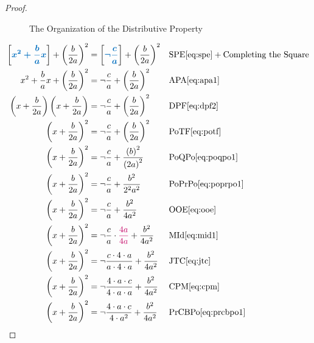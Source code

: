 \documentclass[20150903-160354-rs2.2-MarksMathNotebook.tex]{subfiles}
\begin{document}
\begin{proof}
\begin{figure}[h!]
\begin{center}
\caption{The Organization of the Distributive Property}
\end{center}
\end{figure}

\begin{align*}
\farg{x^2+\dfrac{b}{a}x}+\left( \dfrac{b}{2a} \right)^2 &= \farg{\neg \dfrac{c}{a}} + \left( \dfrac{b}{2a} \right)^2 && \text{SPE} \eqref{eq:spe}+ \text{Completing the Square} \\
x^2+\dfrac{b}{a}x +\left( \dfrac{b}{2a} \right)^2 &= \neg \dfrac{c}{a}+ \left( \dfrac{b}{2a} \right)^2 && \text{APA} \eqref{eq:apa1} \\
\left( x+ \dfrac{b}{2a} \right) \left( x+ \dfrac{b}{2a} \right)& = \neg \dfrac{c}{a} + \left( \dfrac{b}{2a} \right)^2 && \text{DPF} \eqref{eq:dpf2} \\
\left( x+ \dfrac{b}{2a} \right)^2 &=\neg \dfrac{c}{a} + \left( \dfrac{b}{2a} \right)^2 && \text{PoTF} \eqref{eq:potf} \\
\left( x+ \dfrac{b}{2a} \right)^2 &=\neg \dfrac{c}{a} +  \dfrac{\left(b \right)^2}{\left(2a \right)^2}  && \text{PoQPo} \eqref{eq:poqpo1} \\
\left( x+ \dfrac{b}{2a} \right)^2 &=\neg \dfrac{c}{a} +  \dfrac{b^2}{2^2a^2} && \text{PoPrPo} \eqref{eq:poprpo1} \\
\left( x+ \dfrac{b}{2a} \right)^2 &=\neg \dfrac{c}{a} +  \dfrac{b^2}{4a^2} && \text{OOE} \eqref{eq:ooe} \\
\left( x+ \dfrac{b}{2a} \right)^2 &=\neg \dfrac{c}{a} \cdot {\color{sthlmRed}\dfrac{4a}{4a}} +  \dfrac{b^2}{4a^2}  && \text{MId} \eqref{eq:mid1} \\
\left( x+ \dfrac{b}{2a} \right)^2 &=\neg \dfrac{c \cdot 4 \cdot a}{a \cdot 4 \cdot a} +  \dfrac{b^2}{4a^2} && \text{JTC} \eqref{eq:jtc} \\
\left( x+ \dfrac{b}{2a} \right)^2 &=\neg \dfrac{4 \cdot a \cdot c}{4 \cdot a \cdot a} +  \dfrac{b^2}{4a^2}  && \text{CPM} \eqref{eq:cpm} \\
\left( x+ \dfrac{b}{2a} \right)^2 &=\neg \dfrac{4 \cdot a \cdot c}{4 \cdot a^2} +  \dfrac{b^2}{4a^2} && \text{PrCBPo} \eqref{eq:prcbpo1} \\

\end{align*}
\end{proof}
\end{document}

